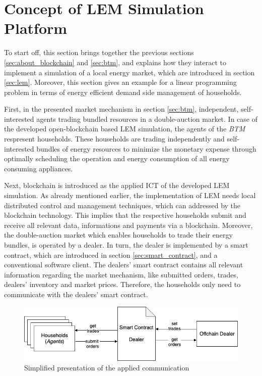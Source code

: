 \section{Concept of LEM Simulation Platform}
To start off, this section brings together the previous sections \ref{sec:about_blockchain} and \ref{sec:btm},
and explains how they interact to implement a simulation of a local energy market, which are introduced in section \ref{sec:lem}.
Moreover, this section gives an example for a linear programming problem in terms of energy efficient demand side management of households. 

First, in the presented market mechanism in section \ref{sec:btm}, independent, self-interested agents trading bundled resources
in a double-auction market. 
In case of the developed open-blockchain based LEM simulation, the agents of the \textit{BTM} respresent households. 
These households are trading independently and self-interested bundles of energy resources 
to minimize the monetary expense through optimally scheduling the operation and energy consumption 
of all energy consuming appliances.

Next, blockchain is introduced as the applied ICT of the developed LEM simulation. 
As already mentioned earlier, the implementation of LEM needs 
local distributed control and management techniques, which can addressed by the blockchain technology.
This implies that the respective households submit and receive all relevant data, informations and payments via a blockchain. 
Moreover, the double-auction market which enables households to trade their energy bundles, is operated by a dealer.
In turn, the dealer is implemented by a smart contract, which are introduced in section \ref{sec:smart_contract}, and a conventional software client. 
The dealers' smart contract contains all relevant information regarding the market mechanism, like submitted orders, trades, 
dealers' inventory and market prices. 
Therefore, the households only need to communicate with the dealers' smart contract. 

\begin{figure}[htbp]
	\centering
	\includegraphics[width=.7\linewidth]{./figures/concept_lem.png}
	\caption{Simplified presentation of the applied communication}
	\label{figure:concept_lem}
\end{figure}

